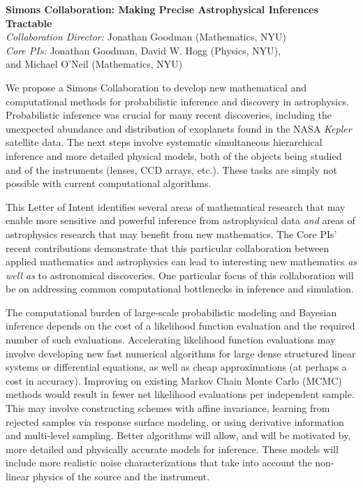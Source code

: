 \documentclass[11pt]{article}
\newcommand{\project}[1]{\textsl{#1}}
\begin{document}
\sloppy\sloppypar\thispagestyle{empty}

\begin{center}
\textbf{Simons Collaboration: Making Precise Astrophysical Inferences
Tractable}\\
\textit{Collaboration Director:} Jonathan Goodman (Mathematics, NYU)\\
\textit{Core PIs:} Jonathan Goodman, David W. Hogg (Physics, NYU),\\ and
Michael O'Neil (Mathematics, NYU)
\end{center}
\smallskip

We propose a Simons Collaboration to develop new mathematical and computational 
methods for probabilistic inference and discovery in astrophysics.
Probabilistic inference was crucial for many recent discoveries,
including the unexpected abundance and distribution of
exoplanets found in the NASA \project{Kepler} satellite data.
The next steps involve systematic simultaneous hierarchical inference
and more detailed physical models, both of the objects being studied and of
the instruments (lenses, CCD arrays, etc.).
These tasks are simply not possible with current computational algorithms.

This Letter of Intent identifies several areas of mathematical research
that may enable more sensitive and powerful inference from astrophysical
data {\em and} areas of astrophysics research that may benefit from new
mathematics.
The Core PIs' recent contributions demonstrate that this particular
collaboration between applied mathematics and astrophysics can lead to
interesting new mathematics {\em as well as} to astronomical
discoveries.
One particular focus of this collaboration will be on addressing
common computational bottlenecks in inference and simulation.

The computational burden of large-scale probabilistic modeling and
Bayesian inference depends on the cost of a likelihood function
evaluation and the required number of such evaluations.
Accelerating likelihood function evaluations may involve developing new
fast numerical algorithms for large dense structured linear systems
or differential equations, as well as cheap approximations (at perhaps a
cost in accuracy).
Improving on existing Markov Chain Monte Carlo (MCMC) methods would
result in fewer net likelihood evaluations per independent sample.
This may involve constructing schemes with affine invariance, learning
from rejected samples via response surface modeling, or using derivative
information and multi-level sampling.
Better algorithms will allow, and will be motivated by, more detailed and
physically accurate models for inference.
These models will include more realistic noise characterizations
that take into
account the non-linear physics of the source and the instrument.
\end{document}
